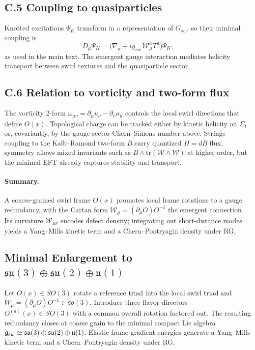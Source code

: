 \documentclass[smallextended]{svjour3}       %
\begin{document}
		\subsection*{C.5 Coupling to quasiparticles}
		Knotted excitations \(\Psi_K\) transform in a representation of \(G_{\!sw}\), so their minimal coupling is
		\[
		D_\mu\Psi_K=\big(\nabla_\mu + i g_{\!sw}\,\mathcal{W}_\mu^a T^a\big)\Psi_K,
		\]
		as used in the main text. The emergent gauge interaction mediates helicity transport between swirl textures and the quasiparticle sector.

		\subsection*{C.6 Relation to vorticity and two-form flux}
		The vorticity 2-form \(\omega_{\mu\nu}=\partial_\mu u_\nu-\partial_\nu u_\mu\) controls the local swirl directions that define \(O(x)\).
		Topological charge can be tracked either by kinetic helicity on \(\Sigma_t\) or, covariantly, by the gauge-sector Chern–Simons number above. Strings coupling to the Kalb–Ramond two-form \(B\) carry quantized \(H=dB\) flux; symmetry allows mixed invariants such as \(B\wedge\mathrm{tr}(\mathcal{W}\wedge\mathcal{W})\) at higher order, but the minimal EFT already captures stability and transport.

		\paragraph{Summary.}
		A coarse-grained swirl frame \(O(x)\) promotes local frame rotations to a gauge redundancy, with the Cartan form \(\mathcal{W}_\mu=(\partial_\mu O)O^{-1}\) the emergent connection. Its curvature \(\mathcal{W}_{\mu\nu}\) encodes defect density; integrating out short-distance modes yields a Yang–Mills kinetic term and a Chern–Pontryagin density under RG.

		\subsection{Minimal Enlargement to \texorpdfstring{$\mathfrak{su}(3)\oplus\mathfrak{su}(2)\oplus\mathfrak u(1)$}{su(3)+su(2)+u(1)}}
		Let \(O(x)\in SO(3)\) rotate a reference triad into the local swirl triad and \(W_\mu=(\partial_\mu O)O^{-1}\in\mathfrak{so}(3)\).
		Introduce three flavor directors \(O^{(a)}(x)\in SO(3)\) with a common overall rotation factored out.
		The resulting redundancy closes at coarse grain to the minimal compact Lie algebra
		\(\mathfrak g_{\textrm sw}\simeq \mathfrak{su}(3)\oplus\mathfrak{su}(2)\oplus\mathfrak u(1)\).
		Elastic frame-gradient energies generate a Yang--Mills kinetic term and a Chern--Pontryagin density under RG.
\end{document}
